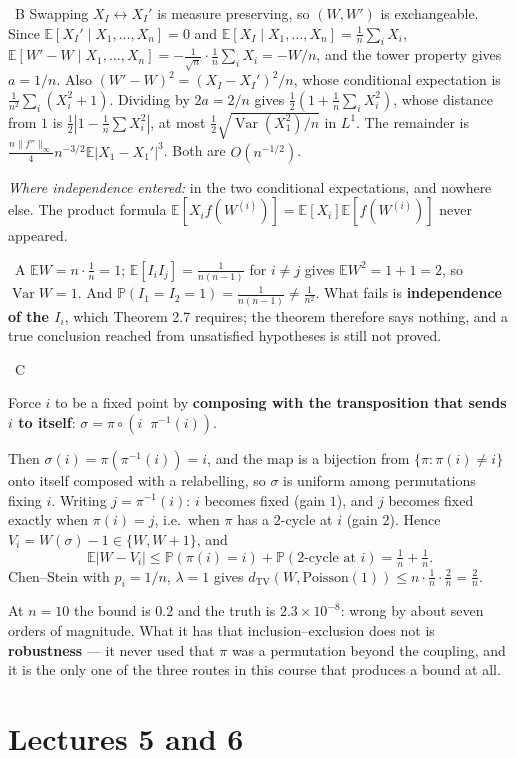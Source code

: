 \documentclass[10pt]{article}
\newcommand{\Q}[2]{\medskip\noindent{\color{acc}\textbf{#1}}\ {\scriptsize\color{grey}\textsc{#2}}\quad}
\newcommand{\E}{\mathbb{E}}
\newcommand{\Prb}{\mathbb{P}}
\newcommand{\Var}{\operatorname{Var}}
\newcommand{\Poi}{\mathrm{Poisson}}
\newcommand{\TV}{d_{\mathrm{TV}}}
\begin{document}
\Q{2.12}{B} Swapping $X_I\leftrightarrow X_I'$ is measure preserving, so $(W,W')$ is exchangeable. Since $\E[X_I'\mid X_1,\dots,X_n]=0$ and $\E[X_I\mid X_1,\dots,X_n]=\frac1n\sum_iX_i$,
$\E[W'-W\mid X_1,\dots,X_n]=-\frac{1}{\sqrt n}\cdot\frac1n\sum_iX_i=-W/n$, and the tower property gives $a=1/n$.
Also $(W'-W)^2=(X_I-X_I')^2/n$, whose conditional expectation is $\frac1{n^2}\sum_i(X_i^2+1)$. Dividing by $2a=2/n$ gives $\tfrac12(1+\frac1n\sum_iX_i^2)$, whose distance from $1$ is $\tfrac12|1-\frac1n\sum X_i^2|$, at most $\tfrac12\sqrt{\Var(X_1^2)/n}$ in $L^1$. The remainder is $\tfrac{n\|f''\|_\infty}{4}n^{-3/2}\E|X_1-X_1'|^3$. Both are $O(n^{-1/2})$.

\emph{Where independence entered:} in the two conditional expectations, and nowhere else. The product formula $\E[X_if(W^{(i)})]=\E[X_i]\E[f(W^{(i)})]$ never appeared.

\Q{2.13}{A} $\E W=n\cdot\frac1n=1$; $\E[I_iI_j]=\frac{1}{n(n-1)}$ for $i\ne j$ gives $\E W^2=1+1=2$, so $\Var W=1$. And $\Prb(I_1=I_2=1)=\frac{1}{n(n-1)}\ne\frac1{n^2}$. What fails is \textbf{independence of the $I_i$}, which Theorem 2.7 requires; the theorem therefore says nothing, and a true conclusion reached from unsatisfied hypotheses is still not proved.

\Q{2.14}{C}
\begin{idea}
Force $i$ to be a fixed point by \textbf{composing with the transposition that sends $i$ to itself}: $\sigma=\pi\circ(i\;\;\pi^{-1}(i))$.
\end{idea}
Then $\sigma(i)=\pi(\pi^{-1}(i))=i$, and the map is a bijection from $\{\pi:\pi(i)\ne i\}$ onto itself composed with a relabelling, so $\sigma$ is uniform among permutations fixing $i$. Writing $j=\pi^{-1}(i)$: $i$ becomes fixed (gain $1$), and $j$ becomes fixed exactly when $\pi(i)=j$, i.e.\ when $\pi$ has a $2$-cycle at $i$ (gain $2$). Hence $V_i=W(\sigma)-1\in\{W,W+1\}$, and
\[
\E|W-V_i|\le\Prb(\pi(i)=i)+\Prb(\text{$2$-cycle at }i)=\tfrac1n+\tfrac1n .
\]
Chen--Stein with $p_i=1/n$, $\lambda=1$ gives $\TV(W,\Poi(1))\le n\cdot\frac1n\cdot\frac2n=\frac2n$.

At $n=10$ the bound is $0.2$ and the truth is $2.3\times10^{-8}$: wrong by about seven orders of magnitude. What it has that inclusion--exclusion does not is \textbf{robustness} --- it never used that $\pi$ was a permutation beyond the coupling, and it is the only one of the three routes in this course that produces a bound at all.

\section{Lectures 5 and 6}
\end{document}
